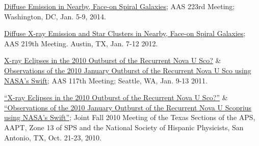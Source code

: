 \documentclass[12pt]{article}
\begin{document}
\begin{etaremune}
\item \href{http://adsabs.harvard.edu/abs/2014AAS...22345311S}{Diffuse Emission in Nearby, Face-on Spiral Galaxies}; AAS 223rd Meeting;
Washington, DC, Jan. 5-9, 2014.

\item \href{http://adsabs.harvard.edu/abs/2012AAS...21934630V}{Diffuse X-ray Emission and Star Clusters in Nearby, Face-on Spiral Galaxies}; AAS 219th Meeting. Austin, TX, Jan. 7-12 2012.

\item \href{http://adsabs.harvard.edu/abs/2011AAS...21733813M}{X-ray Eclipses in the 2010 Outburst of the Recurrent Nova U Sco?} \& \href{http://adsabs.harvard.edu/abs/2011AAS...21733812M}{Observations of the 2010 January Outburst of the Recurrent Nova U Sco using NASA's Swift}; AAS 117th Meeting;
Seattle, WA, Jan. 9-13 2011. 






\item \href{http://adsabs.harvard.edu/abs/2010APS..TSFFP1019V}{“X-ray Eclipses in the 2010 Outburst of the Recurrent Nova U Sco?”} \&  \href{http://adsabs.harvard.edu/abs/2010APS..TSFFP1013M}{“Observations of the 2010 January Outburst of the Recurrent Nova U Scoprius using NASA's Swift”}; Joint Fall 2010 Meeting of the Texas Sections of the APS, AAPT, Zone 13 of SPS and the National Society of Hispanic Physicists, San Antonio, TX, Oct. 21-23, 2010.

\end{etaremune}
\end{document}
